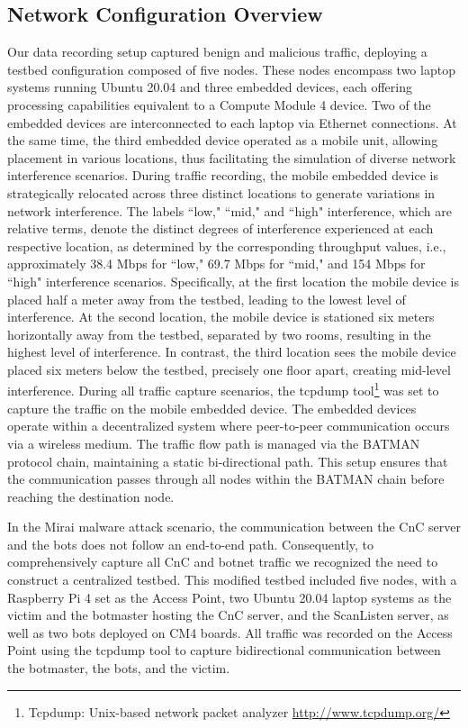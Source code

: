 \documentclass[lettersize,journal]{IEEEtran}
\begin{document}
\subsection{Network Configuration Overview}\label{sec:testbed}
Our data recording setup captured benign and malicious traffic, deploying a testbed configuration composed of five nodes. These nodes encompass two laptop systems running Ubuntu 20.04 and three embedded devices, each offering processing capabilities equivalent to a Compute Module 4 device. Two of the embedded devices are interconnected to each laptop via Ethernet connections. At the same time, the third embedded device operated as a mobile unit, allowing placement in various locations, thus facilitating the simulation of diverse network interference scenarios. During traffic recording, the mobile embedded device is strategically relocated across three distinct locations to generate variations in network interference. The labels ``low," ``mid," and ``high" interference, which are relative terms, denote the distinct degrees of interference experienced at each respective location, as determined by the corresponding throughput values, i.e., approximately 38.4 \ac{Mbps} for ``low," 69.7 \ac{Mbps} for ``mid," and 154 \ac{Mbps} for ``high" interference scenarios. Specifically, at the first location the mobile device is placed half a meter away from the testbed, leading to the lowest level of interference. At the second location, the mobile device is stationed six meters horizontally away from the testbed, separated by two rooms, resulting in the highest level of interference. In contrast, the third location sees the mobile device placed six meters below the testbed, precisely one floor apart, creating mid-level interference. During all traffic capture scenarios, the tcpdump tool\footnote{Tcpdump: Unix-based network packet analyzer \url{http://www.tcpdump.org/}} was set to capture the traffic on the mobile embedded device. The embedded devices operate within a decentralized system where peer-to-peer communication occurs via a wireless medium. The traffic flow path is managed via the \ac{BATMAN} protocol chain, maintaining a static bi-directional path. This setup ensures that the communication passes through all nodes within the \ac{BATMAN} chain before reaching the destination node. 

In the Mirai malware attack scenario, the communication between the \ac{CnC} server and the bots does not follow an end-to-end path. Consequently, to comprehensively capture all \ac{CnC} and botnet traffic we recognized the need to construct a centralized testbed. This modified testbed included five nodes, with a Raspberry Pi 4 set as the Access Point, two Ubuntu 20.04 laptop systems as the victim and the botmaster hosting the \ac{CnC} server, and the ScanListen server, as well as two bots deployed on \ac{CM4} boards. All traffic was recorded on the Access Point using the tcpdump tool to capture bidirectional communication between the botmaster, the bots, and the victim.
\end{document}
